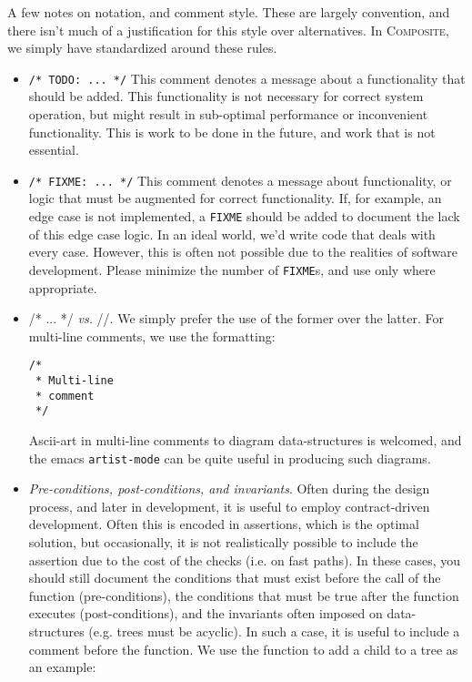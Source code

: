 \documentclass[11pt,onecolumn]{article}
\def\composite{\textsc{Composite}}
\begin{document}
A few notes on notation, and comment style.  These are largely
convention, and there isn't much of a justification for this style
over alternatives.  In \composite , we simply have standardized around
these rules.
\begin{itemize}[itemsep=0pt,topsep=1pt,parsep=1pt,leftmargin=2.5em]
\item {\tt /* TODO: ... */} This comment denotes a message about a
  functionality that should be added.  This functionality is not
  necessary for correct system operation, but might result in
  sub-optimal performance or inconvenient functionality.  This is work
  to be done in the future, and work that is not essential.
\item {\tt /* FIXME: ... */} This comment denotes a message about
  functionality, or logic that must be augmented for correct
  functionality.  If, for example, an edge case is not implemented, a
  {\tt FIXME} should be added to document the lack of this edge case
  logic.  In an ideal world, we'd write code that deals with every
  case.  However, this is often not possible due to the realities of
  software development.  Please minimize the number of {\tt FIXME}s,
  and use only where appropriate.
\item {/* ... */} {\em vs.} {//}.  We simply prefer the use of the
  former over the latter.  For multi-line comments, we use the
  formatting:

    \begin{minipage}{3in}
      \footnotesize
      \lstset{language=C}
      \begin{lstlisting}
/*
 * Multi-line
 * comment
 */
      \end{lstlisting}
    \end{minipage}

  Ascii-art in multi-line comments to diagram data-structures is
  welcomed, and the emacs {\tt artist-mode} can be quite useful in
  producing such diagrams.

\item {\em Pre-conditions, post-conditions, and invariants}.  Often
  during the design process, and later in development, it is useful to
  employ contract-driven development.  Often this is encoded in
  assertions, which is the optimal solution, but occasionally, it is
  not realistically possible to include the assertion due to the cost
  of the checks (i.e. on fast paths).  In these cases, you should
  still document the conditions that must exist before the call of the
  function (pre-conditions), the conditions that must be true after
  the function executes (post-conditions), and the invariants often
  imposed on data-structures (e.g. trees must be acyclic).  In such a
  case, it is useful to include a comment before the function.  We use
  the function to add a child to a tree as an example:


\end{itemize}
\end{document}
